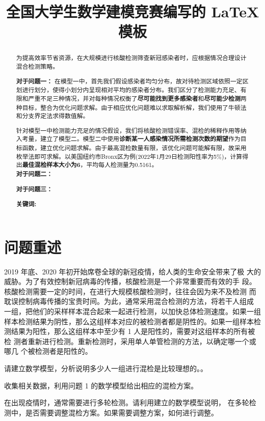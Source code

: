 \documentclass[withoutpreface,bwprint]{cumcmthesis} %
\title{全国大学生数学建模竞赛编写的 \LaTeX{} 模板}%
\begin{document}
\maketitle
\begin{abstract}%


为提高效率节省资源，在大规模进行核酸检测筛查新冠感染者时，应根据情况合理设计混合检测策略。

\textbf{对于问题一：}
在模型一中，首先我们假设感染者均匀分布，故对待检测区域依照一定区划进行划分，使得小划分内呈现相对平均的感染者分布。我们区分了检测能力充足、有限和严重不足三种情况，并对每种情况权衡了\textbf{尽可能找到更多感染者}和\textbf{尽可能少检测}两种目标，整合为优化问题求解。由于相应优化问题难以求取解析解，我们使用了牛顿法和分支界定法求得数值解。

针对模型一中检测能力充足的情况假设，我们将核酸检测错误率、混检的稀释作用等纳入考量，建立了模型二。模型二中使用\textbf{诊断某一人感染情况所需检测次数的期望}作为目标函数，建立优化问题求解。由于最高混检数量有限\cite{bib1}，该优化问题可能解有限，故采用枚举法即可求解。以美国纽约市Bronx区为例(2022年1月29日检测阳性率为5\%)，计算得出\textbf{最佳混检样本大小为6}，平均每人检测量为0.5161。\\
\textbf{对于问题二：}

\textbf{对于问题三：}

\textbf{关键词:}
\end{abstract}



\section{问题重述}
2019 年底、2020 年初开始席卷全球的新冠疫情，给人类的生命安全带来了极
大的威胁。为了有效控制新冠病毒的传播，核酸检测是一个非常重要而有效的手
段。核酸检测需要一定的时间，在进行大规模核酸检测时，往往会因为来不及检测
而耽误控制病毒传播的宝贵时间。为此，通常采用混合检测的方法，将若干人组成
一组，把他们的采样样本混合起来一起进行检测，以加快总体检测速度。如果一组
样本检测结果为阴性，那么这组样本对应的被检测者都是阴性的。如果一组样本检
测结果为阳性，那么这组样本中至少有 1 人是阳性的，需要对这组样本的所有被检
测者重新进行检测。重新检测时，采用单人单管检测的方法，以确定哪一个或哪几
个被检测者是阳性的。

 \begin{problem}
请建立数学模型，分析说明多少人一组进行混检是比较理想的。。
 \end{problem}
 \begin{problem}
收集相关数据，利用问题 1 的数学模型给出相应的混检方案。
 \end{problem}
 \begin{problem}
在出现疫情时，通常需要进行多轮检测。请利用建立的数学模型说明，
在多轮检测中，是否需要调整混检方案。如果需要调整方案，如何进行调整。
\end{problem}
\end{document}

